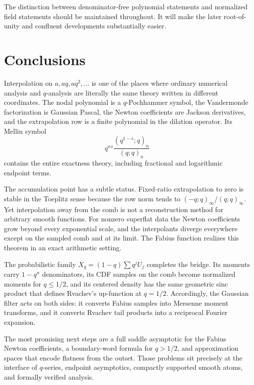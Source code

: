 \documentclass[11pt,a4paper,oneside]{article}
\theoremstyle{definition}
\theoremstyle{remark}
\begin{document}
The distinction between denominator-free polynomial statements and normalized
field statements should be maintained throughout.  It will make the later
root-of-unity and confluent developments substantially easier.

\section{Conclusions}
\label{sec:conclusion}

Interpolation on $a,aq,aq^2,\ldots$ is one of the places where ordinary
numerical analysis and $q$-analysis are literally the same theory written in
different coordinates.  The nodal polynomial is a $q$-Pochhammer symbol, the
Vandermonde factorization is Gaussian Pascal, the Newton coefficients are
Jackson derivatives, and the extrapolation row is a finite polynomial in the
dilation operator.  Its Mellin symbol
\[
 q^{ns}\frac{(q^{1-s};q)_n}{(q;q)_n}
\]
contains the entire exactness theory, including fractional and logarithmic
endpoint terms.

The accumulation point has a subtle status.  Fixed-ratio extrapolation to zero
is stable in the Toeplitz sense because the row norm tends to
$(-q;q)_\infty/(q;q)_\infty$.  Yet interpolation away from the comb is not a
reconstruction method for arbitrary smooth functions.  For nonzero superflat
data the Newton coefficients grow beyond every exponential scale, and the
interpolants diverge everywhere except on the sampled comb and at its limit.
The Fabius function realizes this theorem in an exact arithmetic setting.

The probabilistic family $X_q=(1-q)\sum q^jU_j$ completes the bridge.  Its
moments carry $1-q^n$ denominators, its CDF samples on the comb become
normalized moments for $q\le1/2$, and its centered density has the same
geometric sinc product that defines Rvachev's up-function at $q=1/2$.
Accordingly, the Gaussian filter acts on both sides: it converts Fabius samples
into Mersenne moment transforms, and it converts Rvachev tail products into a
reciprocal Fourier expansion.

The most promising next steps are a full saddle asymptotic for the Fabius
Newton coefficients, a boundary-word formula for $q>1/2$, and approximation
spaces that encode flatness from the outset.  Those problems sit precisely at
the interface of $q$-series, endpoint asymptotics, compactly supported smooth
atoms, and formally verified analysis.

\appendix
\end{document}
